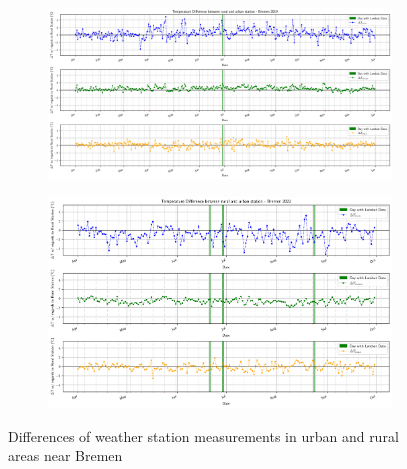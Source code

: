 \documentclass[12pt,a4paper, english,twoside]{scrartcl}
\begin{document}
      \begin{figure}[!p]
         \centering
         \begin{subfigure}[b]{\textwidth}
          \includegraphics[width=\textwidth]{img/BremenDifference2019.png}
          \label{fig:diff2015Bre}
         \end{subfigure}
         \begin{subfigure}[b]{\textwidth}
          \includegraphics[width=\textwidth]{img/BremenDifferences2022.png}
          \label{fig:diff20222Bre}
         \end{subfigure}
         \caption{Differences of weather station measurements in urban and rural areas near Bremen}\label{fig:diffBre}
      \end{figure}
\end{document}
